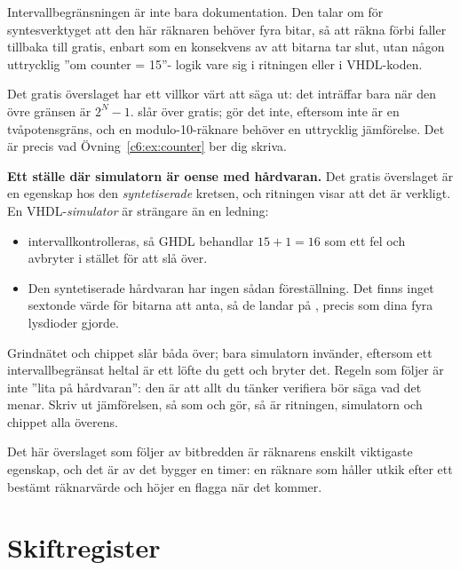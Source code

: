 Intervallbegränsningen  är inte bara dokumentation. Den talar om för syntesverktyget
att den här räknaren behöver fyra bitar, så att räkna förbi  faller tillbaka till 
gratis, enbart som en konsekvens av att bitarna tar slut, utan någon uttrycklig ”om counter = 15”-\!
logik vare sig i ritningen eller i VHDL-koden.

Det gratis överslaget har ett villkor värt att säga ut: det inträffar bara när den övre gränsen är
$2^N - 1$.  slår över gratis;  gör det inte, eftersom  inte är
en tvåpotensgräns, och en modulo-10-räknare behöver en uttrycklig jämförelse. Det är precis vad
Övning~\ref{c6:ex:counter} ber dig skriva.

\begin{warning}
\textbf{Ett ställe där simulatorn är oense med hårdvaran.} Det gratis överslaget är en egenskap hos
den \emph{syntetiserade} kretsen, och ritningen visar att det är verkligt. En
VHDL-\emph{simulator} är strängare än en ledning:
\begin{itemize}
  \item {} intervallkontrolleras, så GHDL behandlar $15 + 1 = 16$ som ett
    fel och avbryter i stället för att slå över.
  \item Den syntetiserade hårdvaran har ingen sådan föreställning. Det finns inget sextonde värde
    för bitarna att anta, så de landar på , precis som dina fyra lysdioder gjorde.
\end{itemize}
Grindnätet och chippet slår båda över; bara simulatorn invänder, eftersom ett intervallbegränsat
heltal är ett löfte du gett och  bryter det. Regeln som följer är inte ”lita på
hårdvaran”: den är att allt du tänker verifiera bör säga vad det menar. Skriv ut jämförelsen, så
som  och  gör, så är ritningen, simulatorn och chippet alla överens.
\end{warning}

Det här överslaget som följer av bitbredden är räknarens enskilt viktigaste egenskap, och det är av
det  bygger en timer: en räknare som håller utkik efter ett bestämt räknarvärde och
höjer en flagga när det kommer.

\section{Skiftregister}
\label{c6:sec:shift}

